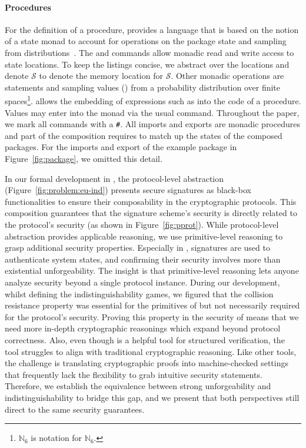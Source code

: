 \paragraph{Procedures}
%
For the definition of a procedure, \ssprove provides
a language that is based on the notion of a state monad 
to account for operations on the package state
and sampling from distributions~\cite{10.1145/143165.143169}.
%
The \cget and \cput commands allow monadic read and write
access to state locations.
%
To keep the listings concise, we abstract over the
locations and denote $\mathcal{S}$ to denote
the memory location for $\mathcal{S}$.
%
Other monadic operations are \cassert statements
and sampling values (\csample) from a probability
distribution over finite spaces\footnote{ $\mathbb{N}_6$ is
notation for  $\mathbb{N}_6$.}.
%
\ssprove allows the embedding of \coq expressions such as
 into the code of a procedure.
%
Values may enter into the  monad
via the usual \cret command.
%
Throughout the paper, we mark all commands with a \texttt{\#}. 
%
All imports and exports are monadic procedures and
part of the composition requires to match up the
states of the composed packages.
%
For the imports and export of the example package %
in Figure~\ref{fig:package}, we omitted this detail.
%

In our formal development in \ssprove, the protocol-level 
abstraction (Figure~\ref{fig:problem:eu-ind}) 
presents secure signatures as black-box functionalities to ensure their composability in the cryptographic protocols. 
%
This composition guarantees that the signature scheme's security is directly 
related to the protocol's security (as shown in Figure~\ref{fig:pprot}). 
%
While protocol-level abstraction provides applicable reasoning, 
we use primitive-level reasoning to grasp additional security properties. 
%
Especially in \ra, signatures are used to authenticate system states, 
and confirming their security involves more than existential unforgeability. 
%
The insight is that primitive-level reasoning lets anyone analyze security 
beyond a single protocol instance.
%
During our development, whilst defining the indistinguishability games, we figured that the collision resistance property 
was essential for the primitives of \ra but not necessarily required for the protocol's security. 
%
Proving this property in the security of \ra means that we need more in-depth cryptographic reasonings which expand beyond protocol correctness. 
%
Also, even though \ssprove is a helpful tool for structured verification, the tool struggles to align with traditional cryptographic reasoning. 
%
Like other tools, the challenge is translating cryptographic proofs 
into machine-checked settings that frequently lack the flexibility to grab intuitive security statements. 
%
Therefore, we establish the equivalence between strong unforgeability and indistinguishability to bridge this gap, 
and we present that both perspectives still direct to the same security guarantees. 
%


